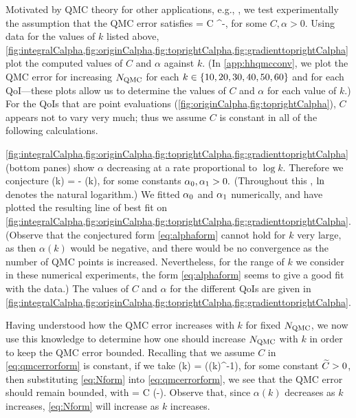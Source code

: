 Motivated by QMC theory for other applications, e.g., \cite[Equation 4.2]{GrKuNuScSl:11}, we test experimentally the assumption that the QMC error satisfies
\beq\label{eq:qmcerrorform}
 = C \NQMC^{-\alpha},
\eeq
for some $C, \alpha > 0.$ Using data for the values of $k$ listed above, \cref{fig:integralCalpha,fig:originCalpha,fig:toprightCalpha,fig:gradienttoprightCalpha} plot the computed values of $C$ and $\alpha$ against $k$. (In \cref{app:hhqmcconv}, we plot the QMC error for increasing $N_{\mathrm{QMC}}$ for each $k \in \set{10,20,30,40,50,60}$ and for each QoI---these plots allow us to determine the values of $C$ and $\alpha$ for each value of $k.$) For the QoIs that are point evaluations (\cref{fig:originCalpha,fig:toprightCalpha}), $C$ appears not to vary very much; thus we assume $C$ is constant in all of the following calculations.

\cref{fig:integralCalpha,fig:originCalpha,fig:toprightCalpha,fig:gradienttoprightCalpha} (bottom panes) show $\alpha$ decreasing at a rate proportional to $\log k$. Therefore we conjecture
\beq\label{eq:alphaform}
\alpha(k) = \alphaz - \alphao\loge(k),
\eeq
for some constants $\alpha_{0},\alpha_{1} > 0.$ (Throughout this , $\operatorname{ln}$ denotes the natural logarithm.) We fitted $\alpha_{0}$ and $\alpha_{1}$ numerically, and have plotted the resulting line of best fit on \cref{fig:integralCalpha,fig:originCalpha,fig:toprightCalpha,fig:gradienttoprightCalpha}. (Observe that the conjectured form \cref{eq:alphaform} cannot hold for $k$ very large, as then $\alpha(k)$ would be negative, and there would be no convergence as the number of QMC points is increased. Nevertheless, for the range of $k$ we consider in these numerical experiments, the form \cref{eq:alphaform} seems to give a good fit with the data.) The values of $C$ and $\alpha$ for the different QoIs are given in \cref{fig:integralCalpha,fig:originCalpha,fig:toprightCalpha,fig:gradienttoprightCalpha}.

Having understood how the QMC error increases with $k$ for fixed $N_{\mathrm{QMC}}$, we now use this knowledge to determine how one should increase $N_{\mathrm{QMC}}$ with $k$ in order to keep the QMC error bounded. Recalling that we assume $C$ in \cref{eq:qmcerrorform} is constant, if we take
\beq\label{eq:Nform}
\NQMC(k) = \exp\mleft(\Ctilde \alpha(k)^{-1}\mright),
\eeq
for some constant $\widetilde{C} > 0$, then substituting \cref{eq:Nform} into \cref{eq:qmcerrorform}, we see that the QMC error should remain bounded, with
\beqs
{} = C \exp\mleft(-\Ctilde\mright).
\eeqs
Observe that, since $\alpha(k)$ decreases as $k$ increases, \cref{eq:Nform} will increase as $k$ increases.

